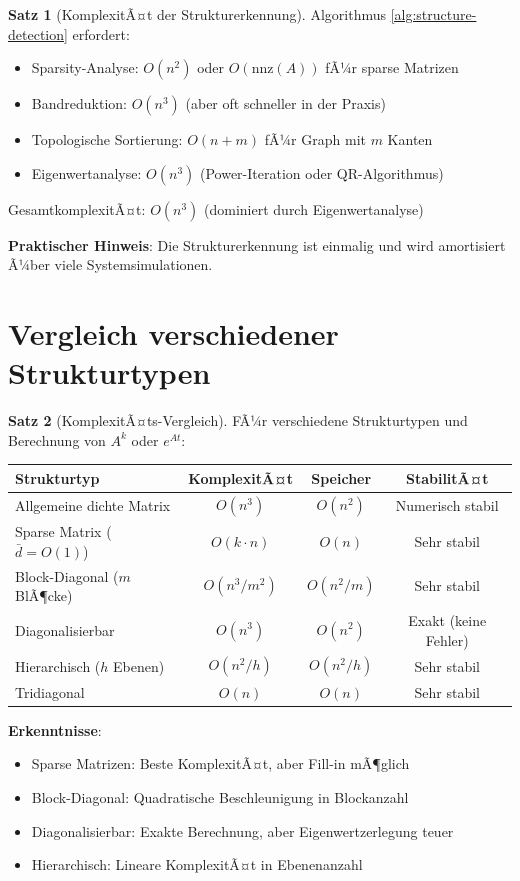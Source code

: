 ﻿\documentclass[a4paper,12pt]{report}
\theoremstyle{definition}
\newtheorem{satz}{Satz}
\begin{document}
	\begin{satz}[KomplexitÃ¤t der Strukturerkennung]
		Algorithmus \ref{alg:structure-detection} erfordert:
		\begin{itemize}
			\item Sparsity-Analyse: $O(n^2)$ oder $O(\text{nnz}(A))$ fÃ¼r sparse Matrizen
			\item Bandreduktion: $O(n^3)$ (aber oft schneller in der Praxis)
			\item Topologische Sortierung: $O(n + m)$ fÃ¼r Graph mit $m$ Kanten
			\item Eigenwertanalyse: $O(n^3)$ (Power-Iteration oder QR-Algorithmus)
		\end{itemize}
		
		GesamtkomplexitÃ¤t: $O(n^3)$ (dominiert durch Eigenwertanalyse)
		
		\textbf{Praktischer Hinweis}: Die Strukturerkennung ist einmalig und wird amortisiert Ã¼ber viele Systemsimulationen.
	\end{satz}
	
	\section{Vergleich verschiedener Strukturtypen}
	
	\begin{satz}[KomplexitÃ¤ts-Vergleich]
		FÃ¼r verschiedene Strukturtypen und Berechnung von $A^k$ oder $e^{At}$:
		
		\begin{center}
			\begin{tabular}{|l|c|c|c|}
				\hline
				\textbf{Strukturtyp} & \textbf{KomplexitÃ¤t} & \textbf{Speicher} & \textbf{StabilitÃ¤t} \\
				\hline
				Allgemeine dichte Matrix & $O(n^3)$ & $O(n^2)$ & Numerisch stabil \\
				Sparse Matrix ($\bar{d} = O(1)$) & $O(k \cdot n)$ & $O(n)$ & Sehr stabil \\
				Block-Diagonal ($m$ BlÃ¶cke) & $O(n^3/m^2)$ & $O(n^2/m)$ & Sehr stabil \\
				Diagonalisierbar & $O(n^3)$ & $O(n^2)$ & Exakt (keine Fehler) \\
				Hierarchisch ($h$ Ebenen) & $O(n^2/h)$ & $O(n^2/h)$ & Sehr stabil \\
				Tridiagonal & $O(n)$ & $O(n)$ & Sehr stabil \\
				\hline
			\end{tabular}
		\end{center}
		
		\textbf{Erkenntnisse}:
		\begin{itemize}
			\item Sparse Matrizen: Beste KomplexitÃ¤t, aber Fill-in mÃ¶glich
			\item Block-Diagonal: Quadratische Beschleunigung in Blockanzahl
			\item Diagonalisierbar: Exakte Berechnung, aber Eigenwertzerlegung teuer
			\item Hierarchisch: Lineare KomplexitÃ¤t in Ebenenanzahl
		\end{itemize}
	\end{satz}
	
\end{document}
